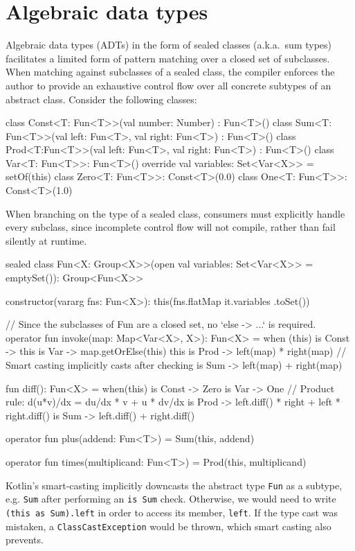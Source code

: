 \documentclass[12pt,initial,twoside,maitrise]{dms}
\def\inline{\lstinline[basicstyle=\ttfamily]}
\numberwithin{equation}{section}
\numberwithin{table}{chapter}
\numberwithin{figure}{chapter}
\begin{document}
\section{Algebraic data types}\label{sec:adts}

\noindent Algebraic data types (ADTs) in the form of sealed classes (a.k.a.\ sum types) facilitates a limited form of pattern matching over a closed set of subclasses. When matching against subclasses of a sealed class, the compiler enforces the author to provide an exhaustive control flow over all concrete subtypes of an abstract class. Consider the following classes:
%
\begin{mylisting}
class Const<T: Fun<T>>(val number: Number) : Fun<T>()
class Sum<T: Fun<T>>(val left: Fun<T>, val right: Fun<T>) : Fun<T>()
class Prod<T:Fun<T>>(val left: Fun<T>, val right: Fun<T>) : Fun<T>()
class Var<T: Fun<T>>: Fun<T>() { override val variables: Set<Var<X>> = setOf(this) }
class Zero<T: Fun<T>>: Const<T>(0.0)
class One<T: Fun<T>>: Const<T>(1.0)
\end{mylisting}
%
When branching on the type of a sealed class, consumers must explicitly handle every subclass, since incomplete control flow will not compile, rather than fail silently at runtime.
%
\begin{mylisting}
sealed class Fun<X: Group<X>>(open val variables: Set<Var<X>> = emptySet()): Group<Fun<X>> {
    constructor(vararg fns: Fun<X>): this(fns.flatMap { it.variables }.toSet())

    // Since the subclasses of Fun are a closed set, no `else -> ...` is required.
    operator fun invoke(map: Map<Var<X>, X>): Fun<X> = when (this) {
        is Const -> this
        is Var -> map.getOrElse(this) { this }
        is Prod -> left(map) * right(map) // Smart casting implicitly casts after checking
        is Sum -> left(map) + right(map)
    }

    fun diff(): Fun<X> = when(this) {
       is Const -> Zero
       is Var -> One
       // Product rule: d(u*v)/dx = du/dx * v + u * dv/dx
       is Prod -> left.diff() * right + left * right.diff()
       is Sum -> left.diff() + right.diff()
    }

    operator fun plus(addend: Fun<T>) = Sum(this, addend)

    operator fun times(multiplicand: Fun<T>) = Prod(this, multiplicand)
}
\end{mylisting}
%
Kotlin's smart-casting implicitly downcasts the abstract type \inline{Fun} as a subtype, e.g. \inline{Sum} after performing an \inline{is Sum} check. Otherwise, we would need to write \inline{(this as Sum).left} in order to access its member, \inline{left}. If the type cast was mistaken, a \inline{ClassCastException} would be thrown, which smart casting also prevents.
\end{document}
